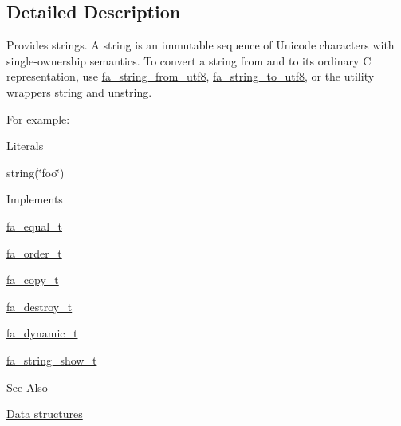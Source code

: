 \subsection{Detailed Description}
Provides strings. A string is an immutable sequence of Unicode characters with single-\/ownership semantics. To convert a string from and to its ordinary C representation, use \hyperlink{group___fa_string_gaecf2d7a3d99b683635cc5493033c09b7}{fa\-\_\-string\-\_\-from\-\_\-utf8}, \hyperlink{group___fa_string_ga001482eba39fa23052477bd72df2b330}{fa\-\_\-string\-\_\-to\-\_\-utf8}, or the utility wrappers {\ttfamily string} and {\ttfamily unstring}.

For example\-:




\begin{DoxyParagraph}{Literals}

\begin{DoxyItemize}
\item {\ttfamily string(\char`\"{}foo\char`\"{})}
\end{DoxyItemize}
\end{DoxyParagraph}
\begin{DoxyParagraph}{Implements }

\begin{DoxyItemize}
\item \hyperlink{structfa__equal__t}{fa\-\_\-equal\-\_\-t}
\item \hyperlink{structfa__order__t}{fa\-\_\-order\-\_\-t}
\item \hyperlink{structfa__copy__t}{fa\-\_\-copy\-\_\-t}
\item \hyperlink{structfa__destroy__t}{fa\-\_\-destroy\-\_\-t}
\item \hyperlink{structfa__dynamic__t}{fa\-\_\-dynamic\-\_\-t}
\item \hyperlink{structfa__string__show__t}{fa\-\_\-string\-\_\-show\-\_\-t}
\end{DoxyItemize}
\end{DoxyParagraph}
\begin{DoxySeeAlso}{See Also}

\begin{DoxyItemize}
\item \hyperlink{md__data_structures_DataStructures}{Data structures} 
\end{DoxyItemize}
\end{DoxySeeAlso}


